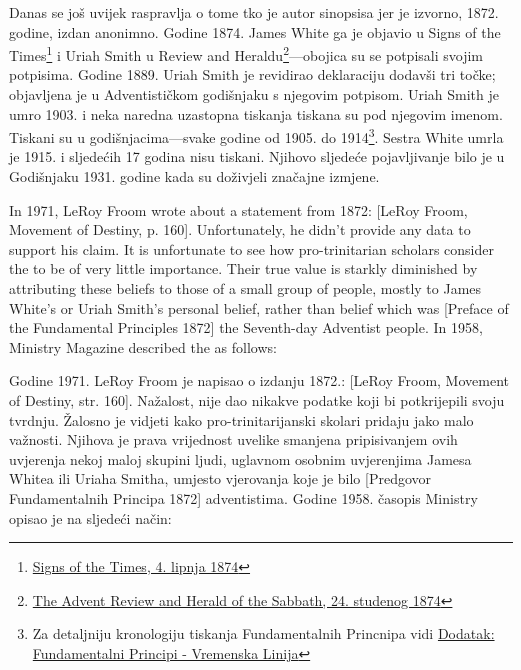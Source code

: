 Danas se još uvijek raspravlja o tome tko je autor sinopsisa jer je izvorno, 1872. godine, izdan anonimno. Godine 1874. James White ga je objavio u Signs of the Times\footnote{\href{https://adventistdigitallibrary.org/adl-364148/signs-times-june-4-1874}{Signs of the Times, 4. lipnja 1874}} i Uriah Smith u Review and Heraldu\footnote{\href{http://documents.adventistarchives.org/Periodicals/RH/RH18741124-V44-22.pdf}{The Advent Review and Herald of the Sabbath, 24. studenog 1874}}—obojica su se potpisali svojim potpisima. Godine 1889. Uriah Smith je revidirao deklaraciju dodavši tri točke; objavljena je u Adventističkom godišnjaku s njegovim potpisom. Uriah Smith je umro 1903. i neka naredna uzastopna tiskanja  tiskana su pod njegovim imenom. Tiskani su u godišnjacima—svake godine od 1905. do 1914\footnote{Za detaljniju kronologiju tiskanja Fundamentalnih Princnipa vidi \hyperref[appendix:timeline]{Dodatak: Fundamentalni Principi - Vremenska Linija}}. Sestra White umrla je 1915. i sljedećih 17 godina  nisu tiskani. Njihovo sljedeće pojavljivanje bilo je u Godišnjaku 1931. godine kada su doživjeli značajne izmjene.


In 1971, LeRoy Froom wrote about a statement from 1872: [LeRoy Froom, Movement of Destiny, p. 160]. Unfortunately, he didn’t provide any data to support his claim. It is unfortunate to see how pro-trinitarian scholars consider the  to be of very little importance. Their true value is starkly diminished by attributing these beliefs to those of a small group of people, mostly to James White’s or Uriah Smith’s personal belief, rather than belief which was [Preface of the Fundamental Principles 1872] the Seventh-day Adventist people. In 1958, Ministry Magazine described the  as follows:


Godine 1971. LeRoy Froom je napisao o izdanju 1872.: [LeRoy Froom, Movement of Destiny, str. 160]. Nažalost, nije dao nikakve podatke koji bi potkrijepili svoju tvrdnju. Žalosno je vidjeti kako pro-trinitarijanski skolari pridaju  jako malo važnosti. Njihova je prava vrijednost uvelike smanjena pripisivanjem ovih uvjerenja nekoj maloj skupini ljudi, uglavnom osobnim uvjerenjima Jamesa Whitea ili Uriaha Smitha, umjesto vjerovanja koje je bilo [Predgovor Fundamentalnih Principa 1872] adventistima. Godine 1958. časopis Ministry opisao je  na sljedeći način:


